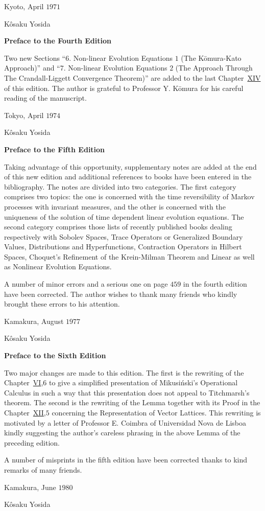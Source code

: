 Kyoto, April $1971$ 

Kôsaku Yosida 

\vspace{6mm}\begin{center}\bfseries Preface to the Fourth Edition\end{center}\vspace{2mm}
Two new Sections ``$6$. Non-linear Evolution Equations $1$ (The Kōmura-Kato Approach)'' and ``$7$. Non-linear Evolution Equations $2$ (The Approach Through The Crandall-Liggett Convergence Theorem)'' are added to the last Chapter~\hyperref[chap:XIV]{XIV} of this edition. The author is grateful to Professor Y. Kōmura for his careful reading of the manuscript. 

Tokyo, April $1974$ 

Kôsaku Yosida 

\vspace{6mm}\begin{center}\bfseries Preface to the Fifth Edition\end{center}\vspace{2mm}
Taking advantage of this opportunity, supplementary notes are added at the end of this new edition and additional references to books have been entered in the bibliography. The notes are divided into two categories. The first category comprises two topics: the one is concerned with the time reversibility of Markov processes with invariant measures, and the other is concerned with the uniqueness of the solution of time dependent linear evolution equations. The second category comprises those lists of recently published books dealing respectively with Sobolev Spaces, Trace Operators or Generalized Boundary Values, Distributions and Hyperfunctions, Contraction Operators in Hilbert Spaces, Choquet's Refinement of the Krein-Milman Theorem and Linear as well as Nonlinear Evolution Equations. 

A number of minor errors and a serious one on page $459$ in the fourth edition have been corrected. The author wishes to thank many friends who kindly brought these errors to his attention. 

Kamakura, August $1977$ 

Kôsaku Yosida 

\vspace{6mm}\begin{center}\bfseries Preface to the Sixth Edition\end{center}\vspace{2mm}
Two major changes are made to this edition. The first is the rewriting of the Chapter~\hyperref[chap:VI]{VI},$6$ to give a simplified presentation of Mikusiński's Operational Calculus in such a way that this presentation does not appeal to Titchmarsh's theorem. The second is the rewriting of the Lemma together with its Proof in the Chapter~\hyperref[chap:XII]{XII},$5$ concerning the Representation of Vector Lattices. This rewriting is motivated by a letter of Professor E. Coimbra of Universidad Nova de Lisboa kindly suggesting the author's careless phrasing in the above Lemma of the preceding edition. 

A number of misprints in the fifth edition have been corrected thanks to kind remarks of many friends. 

Kamakura, June $1980$ 

Kôsaku Yosida 


